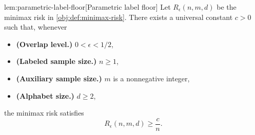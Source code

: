\documentclass[11pt]{article}
\begin{document}
\begin{lemmav}{lem:parametric-label-floor}[Parametric label floor]
Let \(R_\epsilon(n,m,d)\) be the minimax risk in \cref{obj:def:minimax-risk}. There exists a universal constant \(c>0\) such that, whenever
\begin{itemize}
\item \textbf{(Overlap level.)} \(0<\epsilon<1/2\),
\item \textbf{(Labeled sample size.)} \(n\ge 1\),
\item \textbf{(Auxiliary sample size.)} \(m\) is a nonnegative integer,
\item \textbf{(Alphabet size.)} \(d\ge 2\),
\end{itemize}
the minimax risk satisfies
\[
R_\epsilon(n,m,d)\ge \frac{c}{n}.
\]
\end{lemmav}
\end{document}
